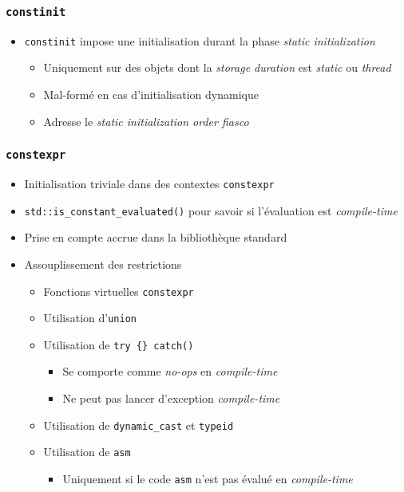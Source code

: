 \documentclass[C++.tex]{subfiles}
\begin{document}
\begin{frame}[fragile]
	\frametitle{\lstinline|constinit|}
	\begin{itemize}
		\item \lstinline|constinit| impose une initialisation durant la phase \textit{static initialization}
		\begin{itemize}
			\item Uniquement sur des objets dont la \textit{storage duration} est \textit{static} ou \textit{thread}
			\item Mal-formé en cas d'initialisation dynamique
			\item Adresse le \textit{static initialization order fiasco}
		\end{itemize}
	\end{itemize}
\end{frame}

\begin{frame}[fragile]
	\frametitle{\lstinline|constexpr|}
	\begin{itemize}
		\item Initialisation triviale dans des contextes \lstinline|constexpr|
		\item \lstinline|std::is_constant_evaluated()| pour savoir si l'évaluation est \textit{compile-time}
		\item Prise en compte accrue dans la bibliothèque standard
		\item Assouplissement des restrictions
		\begin{itemize}
			\item Fonctions virtuelles \lstinline|constexpr|
			\item Utilisation d'\lstinline|union|
			\item Utilisation de \lstinline|try {} catch()|
			\begin{itemize}
				\item Se comporte comme \textit{no-ops} en \textit{compile-time}
				\item Ne peut pas lancer d'exception \textit{compile-time}
			\end{itemize}
			\item Utilisation de \lstinline|dynamic_cast| et \lstinline|typeid|
			\item Utilisation de \lstinline|asm|
			\begin{itemize}
				\item Uniquement si le code \lstinline|asm| n'est pas évalué en \textit{compile-time}


			\end{itemize}
		\end{itemize}
	\end{itemize}
\end{frame}
\end{document}
